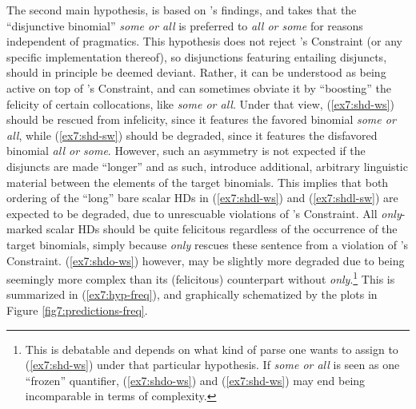 The second main hypothesis, is based on \citet{Benor2006}'s findings, and takes that the ``disjunctive binomial'' \textit{some or all} is preferred to \textit{all or some} for reasons independent of pragmatics. This hypothesis does not reject \citeauthor{Hurford1974}'s Constraint (or any specific implementation thereof), so disjunctions featuring entailing disjuncts, should in principle be deemed deviant. Rather, it can be understood as being active on top of \citeauthor{Hurford1974}'s Constraint, and can sometimes obviate it by ``boosting'' the felicity of certain collocations, like \textit{some or all}. Under that view, (\ref{ex7:shd-ws}) should be rescued from infelicity, since it features the favored binomial \textit{some or all}, while (\ref{ex7:shd-sw}) should be degraded, since it features the disfavored binomial \textit{all or some}. However, such an asymmetry is not expected if the disjuncts are made ``longer'' and as such, introduce additional, arbitrary linguistic material between the elements of the target binomials. This implies that both ordering of the ``long'' bare scalar HDs in (\ref{ex7:shdl-ws}) and (\ref{ex7:shdl-sw}) are expected to be degraded, due to unrescuable violations of \citeauthor{Hurford1974}'s Constraint. All \textit{only}-marked scalar HDs should be quite felicitous regardless of the occurrence of the target binomials, simply because \textit{only} rescues these sentence from a violation of \citeauthor{Hurford1974}'s Constraint. (\ref{ex7:shdo-ws}) however, may be slightly more degraded due to being seemingly more complex than its (felicitous) counterpart without \textit{only}.\footnote{This is debatable and depends on what kind of parse one wants to assign to (\ref{ex7:shd-ws}) under that particular hypothesis. If \textit{some or all} is seen as one ``frozen'' quantifier, (\ref{ex7:shdo-ws}) and (\ref{ex7:shd-ws}) may end being incomparable in terms of complexity.} This is summarized in (\ref{ex7:hyp-freq}), and graphically schematized by the plots in Figure \ref{fig7:predictions-freq}.
\begin{exe}
	\label{ex7:hyp-freq}
\end{exe}
